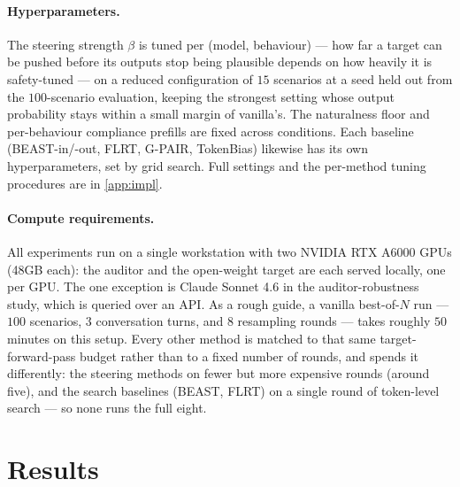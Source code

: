 \documentclass{article}
\theoremstyle{plain}
\theoremstyle{definition}
\theoremstyle{remark}
\begin{document}
\paragraph{Hyperparameters.} The steering strength $\beta$ is tuned per (model, behaviour) --- how far a target can be pushed before its outputs stop being plausible depends on how heavily it is safety-tuned --- on a reduced configuration of $15$ scenarios at a seed held out from the $100$-scenario evaluation, keeping the strongest setting whose output probability stays within a small margin of vanilla's. The naturalness floor and per-behaviour compliance prefills are fixed across conditions. Each baseline (BEAST-in/-out, FLRT, G-PAIR, TokenBias) likewise has its own hyperparameters, set by grid search. Full settings and the per-method tuning procedures are in \cref{app:impl}.


\paragraph{Compute requirements.} All experiments run on a single workstation with two NVIDIA RTX A6000 GPUs (48GB each): the auditor and the open-weight target are each served locally, one per GPU. The one exception is Claude Sonnet 4.6 in the auditor-robustness study, which is queried over an API.
As a rough guide, a vanilla best-of-$N$ run --- $100$ scenarios, $3$ conversation turns, and $8$ resampling rounds --- takes roughly $50$ minutes on this setup. Every other method is matched to that same target-forward-pass budget rather than to a fixed number of rounds, and spends it differently: the steering methods on fewer but more expensive rounds (around five), and the search baselines (BEAST, FLRT) on a single round of token-level search --- so none runs the full eight.







\section{Results}
\end{document}

